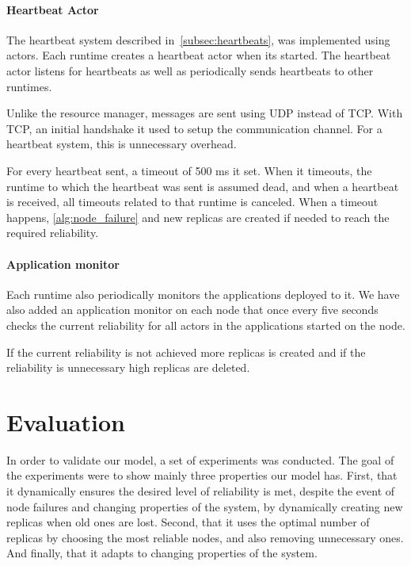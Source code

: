\documentclass{cslthse-msc}
\begin{document}
\subsubsection{Heartbeat Actor}
The heartbeat system described in~\cref{subsec:heartbeats}, was implemented using actors. Each runtime creates a heartbeat actor when its started. The heartbeat actor listens for heartbeats as well as periodically sends heartbeats to other runtimes.

Unlike the resource manager, messages are sent using UDP instead of TCP. With TCP, an initial handshake it used to setup the communication channel. For a heartbeat system, this is unnecessary overhead. 

For every heartbeat sent, a timeout of 500 ms it set. When it timeouts, the runtime to which the heartbeat was sent is assumed dead, and when a heartbeat is received, all timeouts related to that runtime is canceled. When a timeout happens, \cref{alg:node_failure} and new replicas are created if needed to reach the required reliability.

\subsubsection{Application monitor}
Each runtime also periodically monitors the applications deployed to it. We have also added an application monitor on each node that once every five seconds checks the current reliability for all actors in the applications started on the node. 

If the current reliability is not achieved more replicas is created and if the reliability is unnecessary high replicas are deleted.

\chapter{Evaluation} \label{ch:evaluation}
In order to validate our model, a set of experiments was conducted. The goal of the experiments were to show mainly three properties our model has. First, that it dynamically ensures the desired level of reliability is met, despite the event of node failures and changing properties of the system, by dynamically creating new replicas when old ones are lost. Second, that it uses the optimal number of replicas by choosing the most reliable nodes, and also removing unnecessary ones. And finally, that it adapts to changing properties of the system.
\end{document}

